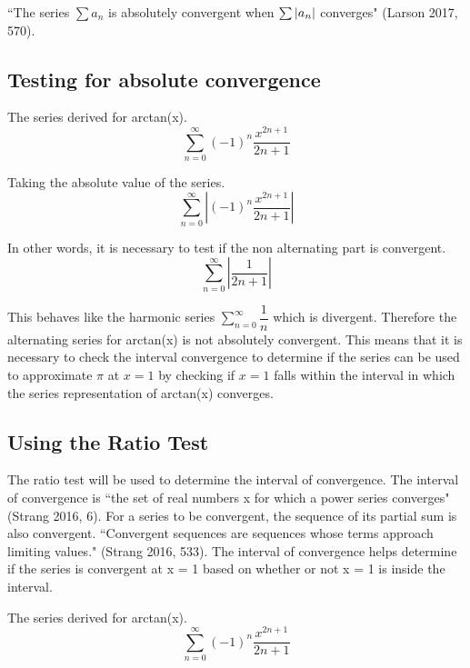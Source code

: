 \documentclass[12pt, titlepage]{article}
\begin{document}
``The series \(\sum a_{n}\) is absolutely convergent when \(\sum \abs{a_{n}}\) converges" (Larson 2017, 570).

\subsection{Testing for absolute convergence}
The series derived for arctan(x).
\begin{equation*}
    \sum_{n=0}^{\infty} (-1)^{n} \frac{x^{2n+1}}{2n+1}
\end{equation*}

Taking the absolute value of the series.
\begin{equation*}
    \sum_{n=0}^{\infty}   \left |  (-1)^{n} \frac{x^{2n+1}}{2n+1} \right |
\end{equation*}

In other words, it is necessary to test if the non alternating part is convergent.
\begin{equation*}
    \sum_{n=0}^{\infty}   \left |\frac{1}{2n+1} \right |
\end{equation*}

This behaves like the harmonic series \(\sum\limits_{n=0}^{\infty} \dfrac{1}{n}\) which is divergent. Therefore the alternating series for arctan(x) is not absolutely convergent. This means that it is necessary to check the interval convergence to determine if the series can be used to approximate \(\pi\) at \(x = 1\) by checking if \(x = 1\) falls within the interval in which the series representation of arctan(x) converges.

\subsection{Using the Ratio Test}
The ratio test will be used to determine the interval of convergence. The interval of convergence is ``the set of real numbers x for which a power series converges" (Strang 2016, 6). For a series to be convergent, the sequence of its partial sum is also convergent. ``Convergent sequences are sequences whose terms approach limiting values." (Strang 2016, 533). The interval of convergence helps determine if the series is convergent at x = 1 based on whether or not x = 1 is inside the interval.

The series derived for arctan(x).
\begin{equation*}
    \sum_{n=0}^{\infty} (-1)^{n} \frac{x^{2n+1}}{2n+1}
\end{equation*}
 
\end{document}
